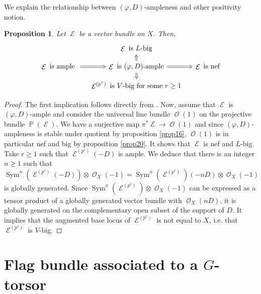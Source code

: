 \documentclass[11pt]{amsart}
\numberwithin{subsection}{section}
\numberwithin{figure}{section}
\numberwithin{table}{section}
\theoremstyle{1}
\newtheorem{proposition}[theorem]{Proposition}
\theoremstyle{2}
\DeclareMathOperator{\Sym}{Sym}
\DeclareMathOperator{\E}{\mathcal{E}}
\DeclareMathOperator{\Oc}{\mathcal{O}}
\DeclareMathOperator{\Pb}{\mathbb{P}}
\begin{document}
We explain the relationship between $(\varphi,D)$-ampleness and other positivity notion. 
\begin{proposition}
Let $\E$ be a vector bundle on $X$. Then,
\begin{equation*}
\begin{tikzcd}[column sep = small, row sep = small]
&  \E \text{ is } L\text{-big} & \\
\E \text{ is ample } \arrow[r,Rightarrow] & \E \text{ is } (\varphi,D)\text{-ample} \arrow[d,Rightarrow] \arrow[u,Rightarrow]\arrow[r,Rightarrow] & \E \text{ is } \text{nef} \\
& \E^{(p^r)} \text{ is } V\text{-big for some }r \geq 1 &
\end{tikzcd}
\end{equation*}
\end{proposition}
\begin{proof}
The first implication follows directly from \cite[Proposition 3.1]{MR289525}. Now, assume that $\E$ is $(\varphi,D)$-ample and consider the universal line bundle $\Oc(1)$ on the projective bundle $\Pb(\E)$. We have a surjective map $\pi^*\E \rightarrow \Oc(1)$ and since $(\varphi,D)$-ampleness is stable under quotient by proposition \ref{prop16}, $\Oc(1)$ is in particular nef and big by proposition \ref{prop20}. It shows that $\E$ is nef and $L$-big. Take $r \geq 1$ such that $\E^{(p^r)}(-D)$ is ample. We deduce that there is an integer $n \geq 1$ such that 
\begin{equation*}
\Sym^n(\E^{(p^r)}(-D)) \otimes \Oc_X(-1) = \Sym^n(\E^{(p^r)})(-nD) \otimes \Oc_X(-1) 
\end{equation*}
is globally generated. Since $\Sym^n(\E^{(p^r)}) \otimes \Oc_X(-1)$ can be expressed as a tensor product of a globally generated vector bundle with $\Oc_X(nD)$, it is globally generated on the complementary open subset of the support of $D$. It implies that the augmented base locus of $\E^{(p^r)}$ is not equal to $X$, i.e. that $\E^{(p^r)}$ is $V$-big.
\end{proof}


\section{Flag bundle associated to a $G$-torsor}\label{sect_flag}
\end{document}
